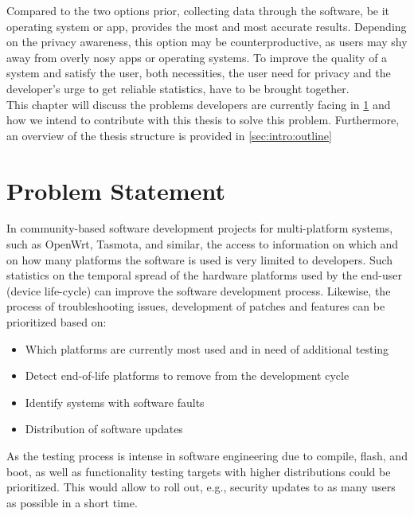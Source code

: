 Compared to the two options prior, collecting data through the software, be it operating system or app, provides the most and most accurate results. Depending on the privacy awareness, this option may be counterproductive, as users may shy away from overly nosy apps or operating systems. To improve the quality of a system and satisfy the user, both necessities, the user need for privacy and the developer's urge to get reliable statistics, have to be brought together.\\

This chapter will discuss the problems developers are currently facing in \ref{sec:intro:probstatement} and how
we intend to contribute with this thesis to solve this problem. Furthermore, an 
overview of the thesis structure is provided in \ref{sec:intro:outline}




\section{Problem Statement}
\label{sec:intro:probstatement}
%
In community-based software development projects for multi-platform systems, such as
OpenWrt, Tasmota, and similar, the access to information on which and on how many platforms
the software is used is very limited to developers.
Such statistics on the temporal spread of the hardware platforms used by
the end-user (device life-cycle) can improve the software development process.
Likewise, the process of troubleshooting issues, development of patches and features can be prioritized based on:
\begin{itemize}
    \item Which platforms are currently most used and in need of additional testing
    \item Detect end-of-life platforms to remove from the development cycle
    \item Identify systems with software faults
    \item Distribution of software updates
\end{itemize}

As the testing process is intense in software engineering due to compile, flash, and boot, as well as functionality testing targets with higher distributions could be prioritized.
This would allow to roll out, e.g., security updates to as many users as possible in a short time.\\

